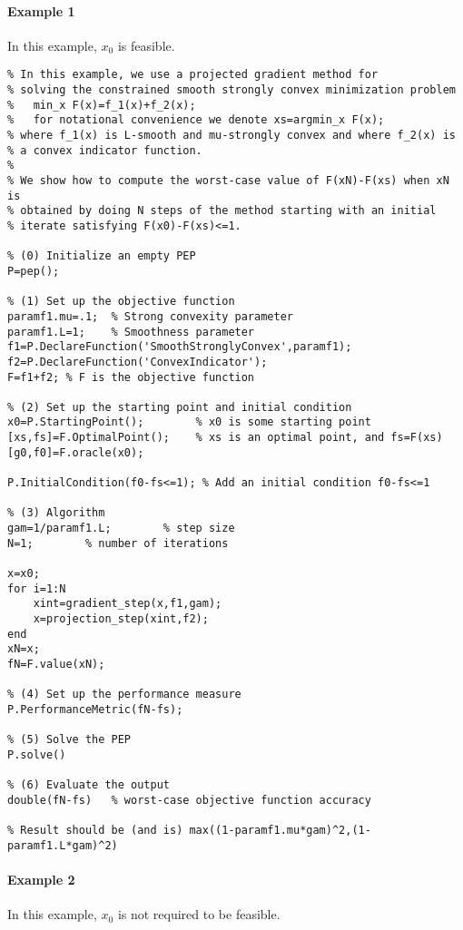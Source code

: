 \documentclass[11pt,a4paper]{article}
\begin{document}
\paragraph{Example 1} In this example, $x_0$ is feasible.
\begin{lstlisting}
% In this example, we use a projected gradient method for
% solving the constrained smooth strongly convex minimization problem
%   min_x F(x)=f_1(x)+f_2(x); 
%   for notational convenience we denote xs=argmin_x F(x);
% where f_1(x) is L-smooth and mu-strongly convex and where f_2(x) is
% a convex indicator function.
%
% We show how to compute the worst-case value of F(xN)-F(xs) when xN is
% obtained by doing N steps of the method starting with an initial
% iterate satisfying F(x0)-F(xs)<=1.

% (0) Initialize an empty PEP
P=pep();

% (1) Set up the objective function
paramf1.mu=.1;	% Strong convexity parameter
paramf1.L=1;    % Smoothness parameter
f1=P.DeclareFunction('SmoothStronglyConvex',paramf1);
f2=P.DeclareFunction('ConvexIndicator');
F=f1+f2; % F is the objective function

% (2) Set up the starting point and initial condition
x0=P.StartingPoint();		 % x0 is some starting point
[xs,fs]=F.OptimalPoint(); 	 % xs is an optimal point, and fs=F(xs)
[g0,f0]=F.oracle(x0);

P.InitialCondition(f0-fs<=1); % Add an initial condition f0-fs<=1

% (3) Algorithm
gam=1/paramf1.L;		% step size
N=1;		% number of iterations

x=x0;
for i=1:N
    xint=gradient_step(x,f1,gam);
    x=projection_step(xint,f2);
end
xN=x;
fN=F.value(xN);

% (4) Set up the performance measure
P.PerformanceMetric(fN-fs);

% (5) Solve the PEP
P.solve()

% (6) Evaluate the output
double(fN-fs)   % worst-case objective function accuracy

% Result should be (and is) max((1-paramf1.mu*gam)^2,(1-paramf1.L*gam)^2)
\end{lstlisting}
\newpage
\paragraph{Example 2} In this example, $x_0$ is not required to be feasible.
\end{document}

